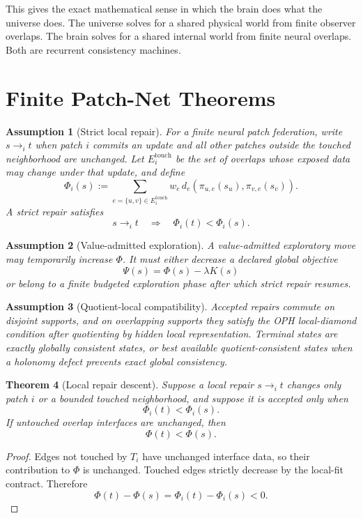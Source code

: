 \documentclass[11pt]{article}
\newtheorem{theorem}{Theorem}[section]
\newtheorem{assumption}[theorem]{Assumption}
\theoremstyle{remark}
\theoremstyle{plain}
\begin{document}
This gives the exact mathematical sense in which the brain does what the universe does. The universe solves for a shared physical world from finite observer overlaps. The brain solves for a shared internal world from finite neural overlaps. Both are recurrent consistency machines.

\section{Finite Patch-Net Theorems}

\begin{assumption}[Strict local repair]
For a finite neural patch federation, write \(s\to_i t\) when patch \(i\) commits an update and all other patches outside the touched neighborhood are unchanged. Let \(E_i^{\mathrm{touch}}\) be the set of overlaps whose exposed data may change under that update, and define
\[
\Phi_i(s):=
\sum_{e=\{u,v\}\in E_i^{\mathrm{touch}}}
w_e\,d_e\!\left(\pi_{u,e}(s_u),\pi_{v,e}(s_v)\right).
\]
A strict repair satisfies
\[
s\to_i t
\quad\Longrightarrow\quad
\Phi_i(t)<\Phi_i(s).
\]
\end{assumption}

\begin{assumption}[Value-admitted exploration]
A value-admitted exploratory move may temporarily increase \(\Phi\). It must either decrease a declared global objective
\[
\Psi(s)=\Phi(s)-\lambda K(s)
\]
or belong to a finite budgeted exploration phase after which strict repair resumes.
\end{assumption}

\begin{assumption}[Quotient-local compatibility]
Accepted repairs commute on disjoint supports, and on overlapping supports they satisfy the OPH local-diamond condition after quotienting by hidden local representation. Terminal states are exactly globally consistent states, or best available quotient-consistent states when a holonomy defect prevents exact global consistency.
\end{assumption}

\begin{theorem}[Local repair descent]
Suppose a local repair \(s\to_i t\) changes only patch \(i\) or a bounded touched neighborhood, and suppose it is accepted only when
\[
\Phi_i(t)<\Phi_i(s).
\]
If untouched overlap interfaces are unchanged, then
\[
\Phi(t)<\Phi(s).
\]
\end{theorem}

\begin{proof}
Edges not touched by \(T_i\) have unchanged interface data, so their contribution to \(\Phi\) is unchanged. Touched edges strictly decrease by the local-fit contract. Therefore
\[
\Phi(t)-\Phi(s)=\Phi_i(t)-\Phi_i(s)<0.
\]
\end{proof}
\end{document}
